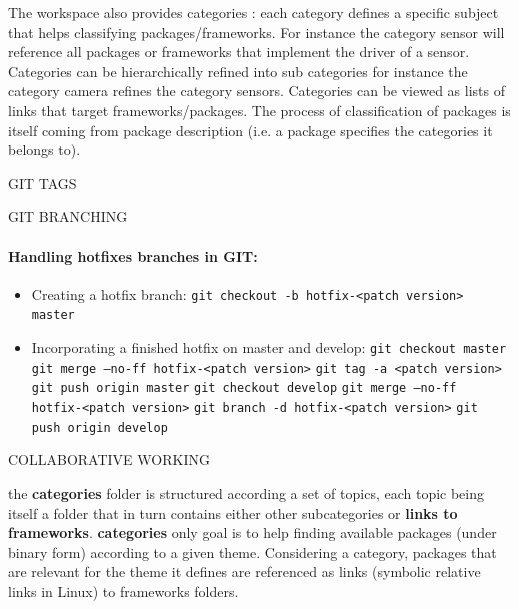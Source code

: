 \documentclass[12pt,a4paper]{article}
\begin{document}
 The workspace also provides categories : each category defines a specific subject that helps classifying packages/frameworks. For instance the category sensor will reference all packages or frameworks that implement the driver of a sensor. Categories can be hierarchically refined into sub categories for instance the category camera refines the category sensors. Categories can be viewed as lists of links that target frameworks/packages. The process of classification of packages is itself coming from package description (i.e. a package specifies the categories it belongs to).
 
 
GIT TAGS
 
GIT BRANCHING
 

\pagebreak
\paragraph{Handling hotfixes branches in GIT:}
\begin{itemize}
\item Creating a hotfix branch:
\linebreak \texttt{git checkout -b hotfix-<patch version> master}
\item Incorporating a finished hotfix on master and develop:
\linebreak \texttt{git checkout master}
\linebreak \texttt{git merge --no-ff hotfix-<patch version>}
\linebreak \texttt{git tag -a <patch version>}
\linebreak \texttt{git push origin master}
\linebreak \texttt{git checkout develop}
\linebreak \texttt{git merge --no-ff hotfix-<patch version>}
\linebreak \texttt{git branch -d  hotfix-<patch version>}
\linebreak \texttt{git push origin develop}
\end{itemize}


COLLABORATIVE WORKING

the \textbf{categories} folder is structured according a set of topics, each topic being itself a folder that in turn contains either other subcategories or \textbf{links to frameworks}. \textbf{categories} only goal is to help finding available packages (under binary form) according to a given theme. Considering a category, packages that are relevant for the theme it defines are referenced as links (symbolic relative links in Linux) to frameworks folders.
\end{document}
